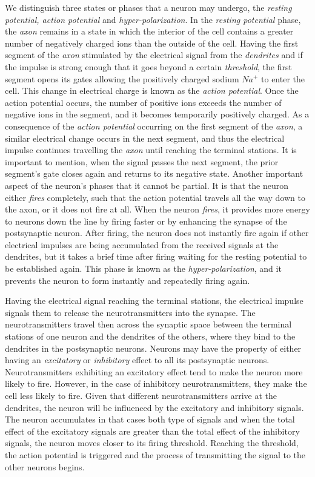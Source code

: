 We distinguish three states or phases that a neuron may undergo, the \emph{resting potential, action potential } and \emph{hyper-polarization}.
In the \emph{resting potential } phase, the \emph{axon} remains in a state in which the interior of the cell contains a greater number of negatively charged ions than the outside of the cell.
Having the first segment of the \emph{axon} stimulated by the electrical signal from the \emph{dendrites} and if the impulse is strong enough that it goes beyond a certain \emph{threshold}, the first segment opens its gates allowing the positively charged sodium $Na^{+}$ to enter the cell. This change in electrical charge is known as the \emph{action potential}. Once the action potential occurs, the number of positive ions exceeds the number of negative ions in the segment, and it becomes temporarily positively charged. As a consequence of the \emph{action potential} occurring on the first segment of the \emph{axon}, a similar electrical change occurs in the next segment, and thus the electrical impulse continues travelling the \emph{axon} until reaching the terminal stations. It is important to mention, when the signal passes the next segment, the prior segment's gate closes again and returns to its negative state. Another important aspect of the neuron's phases that it cannot be partial. It is that the neuron either \emph{fires} completely, such that the action potential travels all the way down to the axon, or it does not fire at all. When the neuron \emph{fires}, it provides more energy to neurons down the line by firing faster or by enhancing the synapse of the postsynaptic neuron. After firing, the neuron does not instantly fire again if other electrical impulses are being accumulated from the received signals at the dendrites, but it takes a brief time after firing waiting for the resting potential to be established again. This phase is known as the \emph{hyper-polarization}, and it prevents the neuron to form instantly and repeatedly firing again.


Having the electrical signal reaching the terminal stations, the electrical impulse signals them to release the neurotransmitters into the synapse. The neurotransmitters travel then across the synaptic space between the terminal stations of one neuron and the dendrites of the others, where they bind to the dendrites in the postsynaptic neurons. Neurons may have the property of either having an \emph{excitatory} or \emph{inhibitory } effect to all its postsynaptic neurons. Neurotransmitters exhibiting an excitatory effect tend to make the neuron more likely to fire. However, in the case of inhibitory neurotransmitters, they make the cell less likely to fire. Given that different neurotransmitters arrive at the dendrites, the neuron will be influenced by the excitatory and inhibitory signals. The neuron accumulates in that cases both type of signals and when the total effect of the excitatory signals are  greater than the total effect of the inhibitory signals, the neuron moves closer to its firing threshold. Reaching the threshold, the action potential is triggered and the process of transmitting the signal to the other neurons begins.

